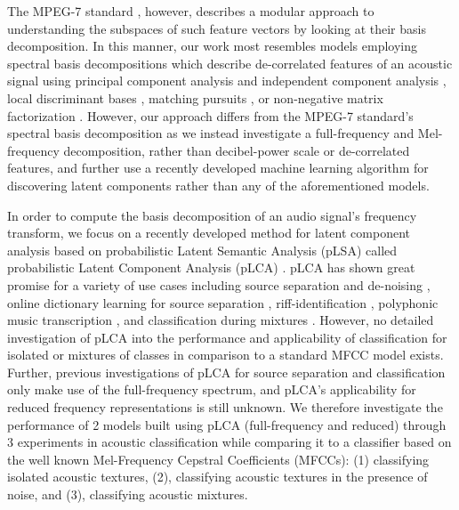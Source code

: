 The MPEG-7 standard \cite{Casey2001a,Manjunath2002}, however, describes a modular approach to understanding the subspaces of such feature vectors by looking at their basis decomposition.  In this manner, our work most resembles models employing spectral basis decompositions which describe de-correlated features of an acoustic signal using principal component analysis and independent component analysis \cite{Casey2001a,Xiong2003,Kim2004}, local discriminant bases \cite{Su2011}, matching pursuits \cite{Chu2009a}, or non-negative matrix factorization \cite{Raj2010}.  However, our approach differs from the MPEG-7 standard's spectral basis decomposition \cite{Casey2001a} as we instead investigate a full-frequency and Mel-frequency decomposition, rather than decibel-power scale or de-correlated features, and further use a recently developed machine learning algorithm for discovering latent components rather than any of the aforementioned models.

In order to compute the basis decomposition of an audio signal's frequency transform, we focus on a recently developed method for latent component analysis based on probabilistic Latent Semantic Analysis (pLSA) \cite{Hofmann1999} called probabilistic Latent Component Analysis (pLCA) \cite{SmaragdisRajShashanka}.   pLCA has shown great promise for a variety of use cases including source separation and de-noising \cite{Smaragdis2007a,Smaragdis2007}, online dictionary learning for source separation \cite{Duan2012}, riff-identification \cite{Weiss2011}, polyphonic music transcription \cite{Benetos2011}, and classification during mixtures \cite{Nam2012}.  However, no detailed investigation of pLCA into the performance and applicability of classification for isolated or mixtures of classes in comparison to a standard MFCC model exists.  Further, previous investigations of pLCA for source separation and classification only make use of the full-frequency spectrum, and pLCA's applicability for reduced frequency representations is still unknown.  We therefore investigate the performance of 2 models built using pLCA (full-frequency and reduced) through 3 experiments in acoustic classification while comparing it to a classifier based on the well known Mel-Frequency Cepstral Coefficients (MFCCs): (1) classifying isolated acoustic textures, (2), classifying acoustic textures in the presence of noise, and (3), classifying acoustic mixtures.  


